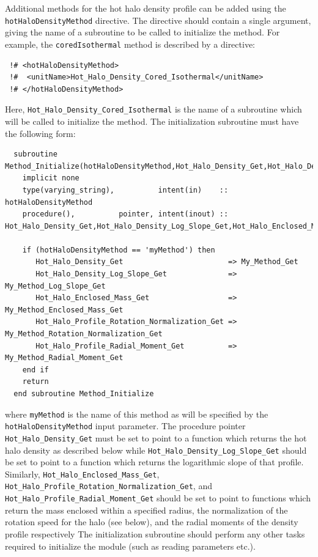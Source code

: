 Additional methods for the hot halo density profile can be added using the {\tt hotHaloDensityMethod} directive. The directive should contain a single argument, giving the name of a subroutine to be called to initialize the method. For example, the {\tt coredIsothermal} method is described by a directive:
\begin{verbatim}
 !# <hotHaloDensityMethod>
 !#  <unitName>Hot_Halo_Density_Cored_Isothermal</unitName>
 !# </hotHaloDensityMethod>
\end{verbatim}
Here, {\tt Hot\_Halo\_Density\_Cored\_Isothermal} is the name of a subroutine which will be called to initialize the method. The initialization subroutine must have the following form:
\begin{verbatim}
  subroutine Method_Initialize(hotHaloDensityMethod,Hot_Halo_Density_Get,Hot_Halo_Density_Log_Slope_Get,Hot_Halo_Profile_Rotation_Normalization_Get)
    implicit none
    type(varying_string),          intent(in)    :: hotHaloDensityMethod
    procedure(),          pointer, intent(inout) :: Hot_Halo_Density_Get,Hot_Halo_Density_Log_Slope_Get,Hot_Halo_Enclosed_Mass_Get
    
    if (hotHaloDensityMethod == 'myMethod') then
       Hot_Halo_Density_Get                        => My_Method_Get
       Hot_Halo_Density_Log_Slope_Get              => My_Method_Log_Slope_Get
       Hot_Halo_Enclosed_Mass_Get                  => My_Method_Enclosed_Mass_Get
       Hot_Halo_Profile_Rotation_Normalization_Get => My_Method_Rotation_Normalization_Get
       Hot_Halo_Profile_Radial_Moment_Get          => My_Method_Radial_Moment_Get
    end if
    return
  end subroutine Method_Initialize
\end{verbatim}
where {\tt myMethod} is the name of this method as will be specified by the {\tt hotHaloDensityMethod} input parameter. The procedure pointer {\tt Hot\_Halo\_Density\_Get} must be set to point to a function which returns the hot halo density as described below while {\tt Hot\_Halo\_Density\_Log\_Slope\_Get} should be set to point to a function which returns the logarithmic slope of that profile. Similarly, {\tt Hot\_Halo\_Enclosed\_Mass\_Get}, {\tt Hot\_Halo\_Profile\_Rotation\_Normalization\_Get}, and {\tt Hot\_Halo\_Profile\_Radial\_Moment\_Get} should be set to point to functions which return the mass enclosed within a specified radius, the normalization of the rotation speed for the halo (see below), and the radial moments of the density profile respectively The initialization subroutine should perform any other tasks required to initialize the module (such as reading parameters etc.).

